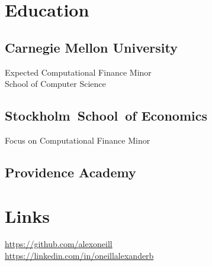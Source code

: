 \documentclass[letterpaper]{deedy-resume}
\begin{document}

  \begin{minipage}[t]{0.33\textwidth}
    \section{Education}
      \subsection{Carnegie Mellon University}
        Expected Computational Finance Minor \\
        School of Computer Science \\

    \sectionspace
    \sectionspace

      \subsection{\mbox{Stockholm School of} \mbox{Economics}}
        Focus on Computational Finance Minor

    \sectionspace
    \sectionspace

      \subsection{Providence Academy}

    \sectionspace

    \section{Links}
      \href{https://github.com/alexoneill}
           {https://github.com/alexoneill}\\
      \href{https://linkedin.com/in/oneillalexanderb}
           {https://linkedin.com/in/oneillalexanderb} \\

    \sectionspace


\end{minipage}
\end{document}
